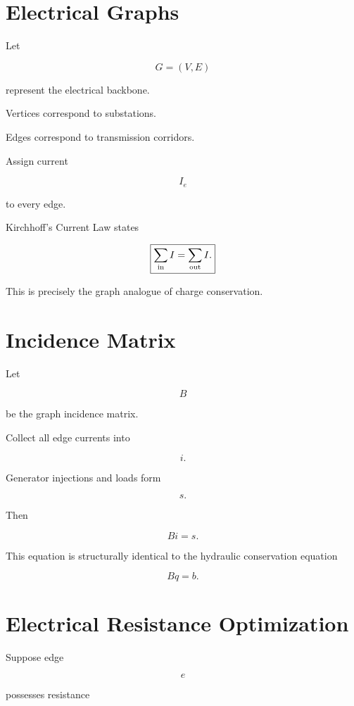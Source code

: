 \documentclass[11pt,fleqn]{book}
\numberwithin{equation}{chapter}
\theoremstyle{plain}
\theoremstyle{definition}
\theoremstyle{remark}
\begin{document}

\section{Electrical Graphs}

Let

\[
G=(V,E)
\]

represent the electrical backbone.

Vertices correspond to substations.

Edges correspond to transmission corridors.

Assign current

\[
I_e
\]

to every edge.

Kirchhoff's Current Law states

\[
\boxed{
\sum_{\rm in}I
=
\sum_{\rm out}I.
}
\]

This is precisely the graph analogue of charge conservation.


\section{Incidence Matrix}

Let

\[
B
\]

be the graph incidence matrix.

Collect all edge currents into

\[
i.
\]

Generator injections and loads form

\[
s.
\]

Then

\[
\boxed{
Bi=s.
}
\]

This equation is structurally identical to the hydraulic conservation
equation

\[
Bq=b.
\]


\section{Electrical Resistance Optimization}

Suppose edge

\[
e
\]

possesses resistance
\end{document}
